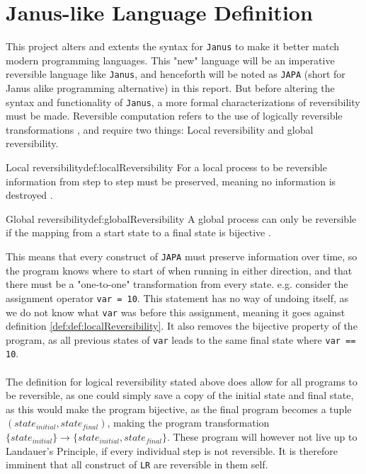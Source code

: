 \section{Janus-like Language Definition} \label{sec:language-def}
This project alters and extents the syntax for \texttt{Janus} to make it better match modern
programming languages. This "new" language will be an imperative reversible language like
\texttt{Janus}, and henceforth will be noted as \texttt{JAPA}
(short for Janus alike programming alternative) in this report.
But before altering the syntax and functionality of \texttt{Janus}, a more formal characterizations
of reversibility must be made.
Reversible computation refers to the use of logically reversible transformations \cite{ARTICLE:2},
and require two things: Local reversibility and global reversibility.

\begin{myDefinition}{Local reversibility}{def:localReversibility}
For a local process to be reversible information from step to step must be preserved, meaning no
information is destroyed \cite{ARTICLE:1}.
\end{myDefinition}

\begin{myDefinition}{Global reversibility}{def:globalReversibility}
A global process can only be reversible if the mapping from a start state to a final state is
bijective \cite{ARTICLE:1}. 
\end{myDefinition}
\noindent
This means that every construct of \texttt{JAPA} must preserve information over time, so the program
knows where to start of when running in either direction, and that there must be a "one-to-one"
transformation from every state. e.g. consider the assignment operator \texttt{var = 10}. This
statement has no way of undoing itself, as we do not know what \texttt{var} was before this
assignment, meaning it goes against definition \ref{def:def:localReversibility}. It also removes
the bijective property of the program, as all previous states of \texttt{var} leads to the same
final state where \texttt{var == 10}.
\\
\\
The definition for logical reversibility stated above does allow for all programs to be reversible,
as one could simply save a copy of the initial state and final state, as this would make
the program bijective, as the final program becomes a tuple $(state_{initial}, state_{final})$,
making the program transformation $\{state_{initial}\} \to \{state_{initial}, state_{final}\}$.
These program will however not live up to Landauer's Principle, if every individual step is not
reversible. It is therefore imminent that all construct of \texttt{LR} are reversible in them self.

